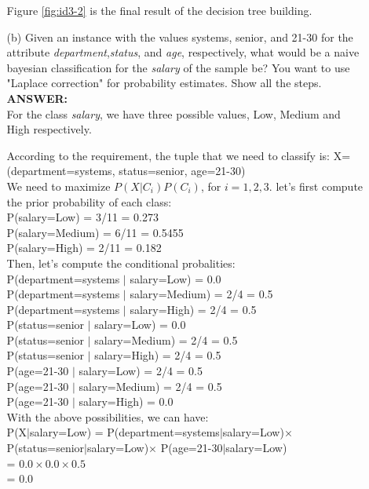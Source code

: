 \documentclass{article}
\begin{document}
\begin{enumerate}
\begin{enumerate}
Figure \ref{fig:id3-2} is the final result of the decision tree building. 

\item[(b)] Given an instance with the values systems, senior, and
  21-30 for the attribute {\it department},{\it status}, and
  {\it age}, respectively, what would be a naive bayesian
  classification for the {\it salary} of the sample be? You want to
  use "Laplace correction" for probability estimates. Show all the
  steps. \\
\textbf{ANSWER:} \\
For the class {\it salary}, we have three possible values, Low, Medium
and High respectively.

According to the requirement, the tuple that we need to classify is:
X=(department=systems, status=senior, age=21-30) \\
We need to maximize $P(X|C_i)P(C_i)$, for $i=1,2,3$. let's first
compute the prior probability of each class: \\
P(salary=Low) = 3/11 = 0.273 \\
P(salary=Medium) = 6/11 = 0.5455\\
P(salary=High) = 2/11 = 0.182\\

Then, let's compute the conditional probalities: \\
P(department=systems $|$ salary=Low) = 0.0 \\
P(department=systems $|$ salary=Medium) = 2/4 = 0.5 \\
P(department=systems $|$ salary=High) = 2/4 = 0.5 \\
P(status=senior $|$ salary=Low) = 0.0 \\
P(status=senior $|$ salary=Medium) = 2/4 = 0.5 \\
P(status=senior $|$ salary=High) = 2/4 = 0.5 \\
P(age=21-30 $|$ salary=Low) = 2/4 = 0.5 \\
P(age=21-30 $|$ salary=Medium) = 2/4 = 0.5 \\
P(age=21-30 $|$ salary=High) = 0.0 \\

With the above possibilities, we can have: \\ 
P(X$|$salary=Low) = P(department=systems$|$salary=Low)$\times$ \\
P(status=senior$|$salary=Low)$\times$ P(age=21-30$|$salary=Low) \\
= $0.0 \times 0.0 \times 0.5$ \\
= 0.0 \\


\end{enumerate}
\end{enumerate}
\end{document}
